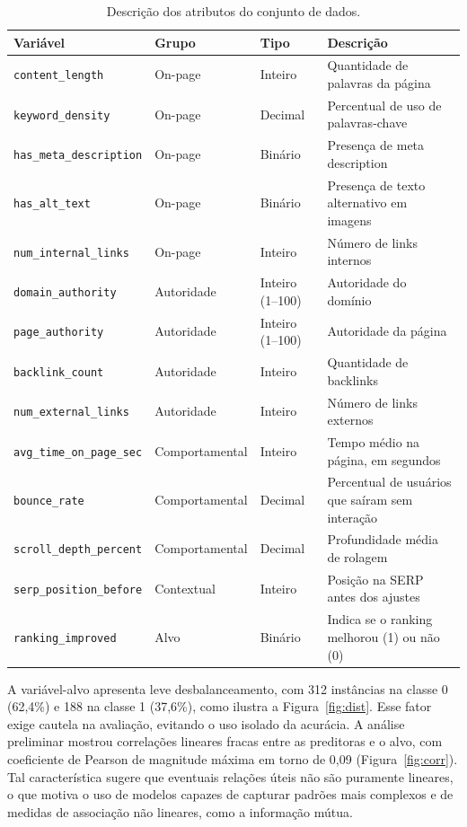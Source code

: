 \documentclass[12pt]{article}
\begin{document}
\begin{table}[ht]
\centering
\caption{Descrição dos atributos do conjunto de dados.}
\label{tab:variaveis}
\footnotesize
\begin{tabular}{p{3.6cm}p{2.2cm}p{2.4cm}p{4.4cm}}
\toprule
\textbf{Variável} & \textbf{Grupo} & \textbf{Tipo} & \textbf{Descrição} \\
\midrule
\texttt{content\_length} & On-page & Inteiro & Quantidade de palavras da página \\
\texttt{keyword\_density} & On-page & Decimal & Percentual de uso de palavras-chave \\
\texttt{has\_meta\_description} & On-page & Binário & Presença de meta description \\
\texttt{has\_alt\_text} & On-page & Binário & Presença de texto alternativo em imagens \\
\texttt{num\_internal\_links} & On-page & Inteiro & Número de links internos \\
\texttt{domain\_authority} & Autoridade & Inteiro (1--100) & Autoridade do domínio \\
\texttt{page\_authority} & Autoridade & Inteiro (1--100) & Autoridade da página \\
\texttt{backlink\_count} & Autoridade & Inteiro & Quantidade de backlinks \\
\texttt{num\_external\_links} & Autoridade & Inteiro & Número de links externos \\
\texttt{avg\_time\_on\_page\_sec} & Comportamental & Inteiro & Tempo médio na página, em segundos \\
\texttt{bounce\_rate} & Comportamental & Decimal & Percentual de usuários que saíram sem interação \\
\texttt{scroll\_depth\_percent} & Comportamental & Decimal & Profundidade média de rolagem \\
\texttt{serp\_position\_before} & Contextual & Inteiro & Posição na SERP antes dos ajustes \\
\texttt{ranking\_improved} & Alvo & Binário & Indica se o ranking melhorou (1) ou não (0) \\
\bottomrule
\end{tabular}
\end{table}

A variável-alvo apresenta leve desbalanceamento, com 312 instâncias na classe 0 (62,4\%) e 188 na
classe 1 (37,6\%), como ilustra a Figura~\ref{fig:dist}. Esse fator exige cautela na avaliação,
evitando o uso isolado da acurácia. A análise preliminar mostrou correlações lineares fracas entre
as preditoras e o alvo, com coeficiente de Pearson de magnitude máxima em torno de 0,09
(Figura~\ref{fig:corr}). Tal característica sugere que eventuais relações úteis não são puramente
lineares, o que motiva o uso de modelos capazes de capturar padrões mais complexos e de medidas de
associação não lineares, como a informação mútua.
\end{document}
